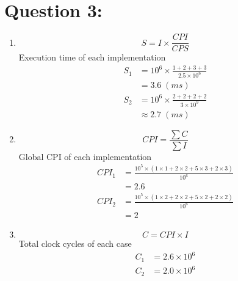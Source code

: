 \documentclass[12pt,a4paper]{article}
\begin{document}
\section*{Question 3:}
\begin{enumerate}[label=\alph*.]
  \item%
        \begin{equation*}
          S = I \times \frac{CPI}{CPS}
        \end{equation*}
        Execution time of each implementation
        \begin{align*}
          S_1 & = 10^6 \times \frac{1 + 2 + 3 + 3}{2.5 \times 10^9} \\
              & = 3.6\;(ms)                                         \\
          S_2 & = 10^6 \times \frac{2 + 2 + 2 + 2}{3 \times 10^9}   \\
              & \approx 2.7\;(ms)
        \end{align*}
  \item%
        \begin{equation*}
          CPI = \frac{\sum C}{\sum I}
        \end{equation*}
        Global CPI of each implementation
        \begin{align*}
          CPI_1 & = \frac{10^5 \times (1 \times 1 + 2 \times 2 + 5 \times 3 + 2 \times 3)}{10^6} \\
                & = 2.6                                                                          \\
          CPI_2 & = \frac{10^5 \times (1 \times 2 + 2 \times 2 + 5 \times 2 + 2 \times 2)}{10^6} \\
                & = 2
        \end{align*}
  \item%
        \begin{equation*}
          C = CPI \times I
        \end{equation*}
        Total clock cycles of each case
        \begin{align*}
          C_1 & = 2.6 \times 10^6 \\
          C_2 & = 2.0 \times 10^6
        \end{align*}
\end{enumerate}

\end{document}
